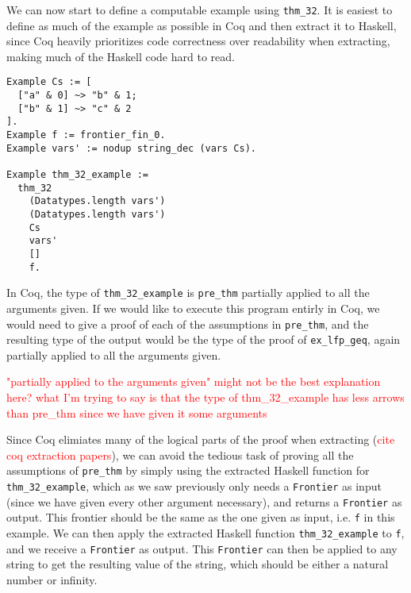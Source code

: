 We can now start to define a computable example using \lstinline{thm_32}.
It is easiest to define as much of the example as possible in Coq and then extract it to Haskell,
since Coq heavily prioritizes code correctness over readability when extracting,
making much of the Haskell code hard to read.

\begin{minipage}{\linewidth}
\begin{lstlisting}[language=Coq, label={lst:thm_32_coq_example}, caption={\lstinline{thm_32} example}]
Example Cs := [
  ["a" & 0] ~> "b" & 1;
  ["b" & 1] ~> "c" & 2
].
Example f := frontier_fin_0.
Example vars' := nodup string_dec (vars Cs).

Example thm_32_example :=
  thm_32
    (Datatypes.length vars')
    (Datatypes.length vars')
    Cs
    vars'
    []
    f.
\end{lstlisting}
\end{minipage}

In Coq, the type of \lstinline{thm_32_example} is \lstinline{pre_thm} partially applied to all the arguments given.
If we would like to execute this program entirly in Coq, we would need to give a proof of each of the assumptions
in \lstinline{pre_thm}, and the resulting type of the output would be the type of the proof of \lstinline{ex_lfp_geq},
again partially applied to all the arguments given.

\textcolor{red}{"partially applied to the arguments given" might not be the best explanation here? what I'm trying to say is
that the type of thm\_32\_example has less arrows than pre\_thm since we have given it some arguments}

Since Coq elimiates many of the logical parts of the proof when extracting (\textcolor{red}{cite coq extraction papers}),
we can avoid the tedious task of proving all the assumptions of \lstinline{pre_thm} by simply
using the extracted Haskell function for \lstinline{thm_32_example}, which as we saw previously only needs a \lstinline{Frontier}
as input (since we have given every other argument necessary), and returns a \lstinline{Frontier} as output.
This frontier should be the same as the one given as input, i.e. \lstinline{f} in this example.
We can then apply the extracted Haskell function \lstinline{thm_32_example} to \lstinline{f},
and we receive a \lstinline{Frontier} as output.
This \lstinline{Frontier} can then be applied to any string to get the resulting value of the string,
which should be either a natural number or infinity.

